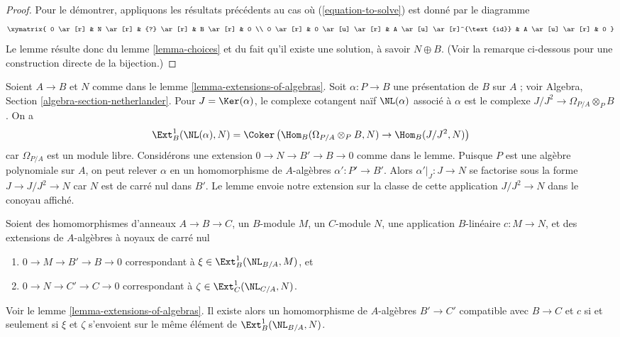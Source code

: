 \begin{proof}
Pour le démontrer, appliquons les résultats précédents au cas où
(\ref{equation-to-solve}) est donné par le diagramme
$$
\xymatrix{
0 \ar[r] & N \ar[r] & {?} \ar[r] & B \ar[r] & 0 \\
0 \ar[r] & 0 \ar[u] \ar[r] & A \ar[u] \ar[r]^{\text{id}} & A \ar[u] \ar[r] & 0
}
$$
Le lemme résulte donc du lemme \ref{lemma-choices}
et du fait qu'il existe une solution, à savoir $N \oplus B$.
(Voir la remarque ci-dessous pour une construction directe de la bijection.)
\end{proof}

\begin{remark}
\label{remark-extensions-of-algebras}
Soient $A \to B$ et $N$ comme dans le lemme \ref{lemma-extensions-of-algebras}.
Soit $\alpha : P \to B$ une présentation de $B$ sur $A$ ; voir
Algebra, Section \ref{algebra-section-netherlander}.
Pour $J = \Ker(\alpha)$, le complexe cotangent naïf $\NL(\alpha)$
associé à $\alpha$ est le complexe $J/J^2 \to \Omega_{P/A} \otimes_P B$.
On a
$$
\Ext^1_B(\NL(\alpha), N) =
\Coker\left(\Hom_B(\Omega_{P/A} \otimes_P B, N) \to \Hom_B(J/J^2, N)\right)
$$
car $\Omega_{P/A}$ est un module libre.
Considérons une extension $0 \to N \to B' \to B \to 0$ comme dans le lemme.
Puisque $P$ est une algèbre polynomiale sur $A$, on peut
relever $\alpha$ en un homomorphisme de $A$-algèbres $\alpha' : P' \to B'$.
Alors $\alpha'|_J : J \to N$ se factorise sous la forme $J \to J/J^2 \to N$
car $N$ est de carré nul dans $B'$. Le lemme envoie notre extension
sur la classe de cette application $J/J^2 \to N$ dans le conoyau affiché.
\end{remark}












\begin{lemma}
\label{lemma-extensions-of-algebras-functorial}
Soient des homomorphismes d'anneaux $A \to B \to C$, un $B$-module $M$, un $C$-module $N$,
une application $B$-linéaire $c : M \to N$, et des extensions de
$A$-algèbres à noyaux de carré nul
\begin{enumerate}
\item[(a)] $0 \to M \to B' \to B \to 0$ correspondant à
$\xi \in \Ext^1_B(\NL_{B/A}, M)$, et
\item[(b)] $0 \to N \to C' \to C \to 0$ correspondant à
$\zeta \in \Ext^1_C(\NL_{C/A}, N)$.
\end{enumerate}
Voir le lemme \ref{lemma-extensions-of-algebras}.
Il existe alors un homomorphisme de $A$-algèbres $B' \to C'$ compatible avec
$B \to C$ et $c$ si et seulement si $\xi$ et $\zeta$
s'envoient sur le même élément de
$\Ext^1_B(\NL_{B/A}, N)$.
\end{lemma}

